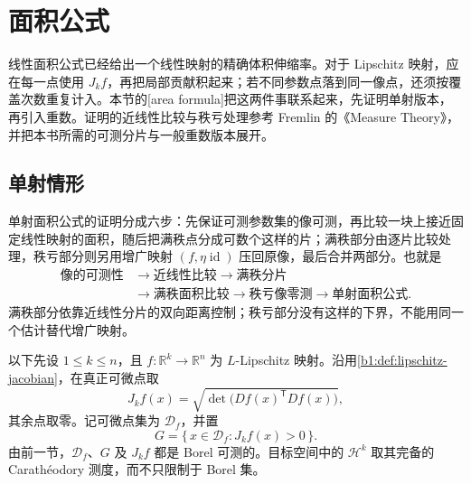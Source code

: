 \section{面积公式}
\label{b1:sec:1703}

线性面积公式已经给出一个线性映射的精确体积伸缩率。对于 Lipschitz 映射，应在每一点使用 \(J_kf\)，再把局部贡献积起来；若不同参数点落到同一像点，还须按覆盖次数重复计入。本节的[area formula]把这两件事联系起来，先证明单射版本，再引入重数。证明的近线性比较与秩亏处理参考 Fremlin 的《Measure Theory》\cite[265D--E]{Fremlin2016Measure}，并把本书所需的可测分片与一般重数版本展开。


\subsection{单射情形}
\label{b1:subsec:170301}

单射面积公式的证明分成六步：先保证可测参数集的像可测，再比较一块上接近固定线性映射的面积，随后把满秩点分成可数个这样的片；满秩部分由逐片比较处理，秩亏部分则另用增广映射 \((f,\eta\operatorname{id})\) 压回原像，最后合并两部分。也就是
\[
 \begin{aligned}
 \text{像的可测性}
 &\longrightarrow\text{近线性比较}
 \longrightarrow\text{满秩分片}\\
 &\longrightarrow\text{满秩面积比较}
 \longrightarrow\text{秩亏像零测}
 \longrightarrow\text{单射面积公式}.
 \end{aligned}
\]
满秩部分依靠近线性分片的双向距离控制；秩亏部分没有这样的下界，不能用同一个估计替代增广映射。

\ProseParagraphBreak

以下先设 \(1\leq k\leq n\)，且 \(f:\mathbb R^k\rightarrow\mathbb R^n\) 为 \(L\)-Lipschitz 映射。沿用\cref{b1:def:lipschitz-jacobian}，在真正可微点取
\[
 J_kf(x)=\sqrt{\det\bigl(Df(x)^{\mathsf T}Df(x)\bigr)},
\]
其余点取零。记可微点集为 \(\mathcal D_f\)，并置
\[
 G=\{\,x\in\mathcal D_f:J_kf(x)>0\,\}.
\]
由前一节，\(\mathcal D_f\)、\(G\) 及 \(J_kf\) 都是 Borel 可测的。目标空间中的 \(\mathcal H^k\) 取其完备的 Carathéodory 测度，而不只限制于 Borel 集。


